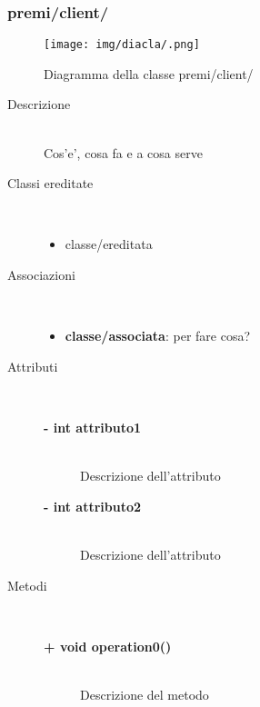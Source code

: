 \subsubsection{premi/client/}
\begin{figure}[h]
\begin{center}
\texttt{[image: img/diacla/.png]}
\caption{Diagramma della classe premi/client/}
\end{center}
\end{figure}




\begin{description}
\item[Descrizione] \hfill \\
	Cos'e', cosa fa e a cosa serve
	
	
\item[Classi ereditate] \hfill \\
	\begin{itemize}
		\item classe/ereditata
	\end{itemize}
	
	
\item[Associazioni] \hfill \\
	\begin{itemize}
		\item \textbf{classe/associata}: per fare cosa?
	\end{itemize}
	
	
\item[Attributi] \hfill \\
	\begin{description}
		\item[\textbf{- int attributo1			}] \hfill \\
			Descrizione dell'attributo
		\item[\textbf{- int attributo2			}] \hfill \\
			Descrizione dell'attributo
	\end{description}
	
	
\item[Metodi] \hfill \\

	\begin{description}
		\item[\textbf{\color{blue}+ void operation0()			}] \hfill \\
			Descrizione del metodo
			

\end{description}
\end{description}
